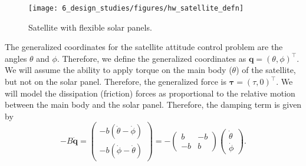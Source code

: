 
\begin{figure}[hbt]
  \centering\texttt{[image: 6\_design\_studies/figures/hw\_satellite\_defn]}
  \caption{Satellite with flexible solar panels.}
  \label{fig:sm_satellite_defn}  
\end{figure}



The generalized coordinates for the satellite attitude control problem are the angles $\theta$ and $\phi$.  Therefore, we define the generalized coordinates as $\mathbf{q}=(\theta, \phi)^\top$.  We will assume the ability to apply torque on the main body ($\theta$) of the satellite, but not on the solar panel.  Therefore, the generalized force is $\boldsymbol{\tau} = (\tau, 0)^\top$.  We will model the dissipation (friction) forces as proportional to the relative motion between the main body and the solar panel.  Therefore, the damping term is given by
\[
-B\dot{\mathbf{q}} = \begin{pmatrix}-b(\dot{\theta}-\dot{\phi}) \\ -b(\dot{\phi}-\dot{\theta}) \end{pmatrix} = -\begin{pmatrix} b & -b \\ -b & b \end{pmatrix}\begin{pmatrix}\dot{\theta} \\ \dot{\phi}\end{pmatrix}.
\]

